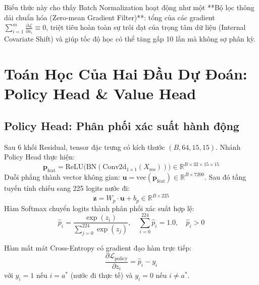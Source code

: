 \documentclass[11pt,a4paper]{report}
\begin{document}
Biểu thức này cho thấy Batch Normalization hoạt động như một **Bộ lọc thông dải chuẩn hóa (Zero-mean Gradient Filter)**: tổng của các gradient $\sum_{i=1}^m \frac{\partial \mathcal{L}}{\partial x_i} \equiv 0$, triệt tiêu hoàn toàn sự trôi dạt của trọng tâm dữ liệu (Internal Covariate Shift) và giúp tốc độ học có thể tăng gấp 10 lần mà không sợ phân kỳ.

\section{Toán Học Của Hai Đầu Dự Đoán: Policy Head \& Value Head}

\subsection{Policy Head: Phân phối xác suất hành động}
Sau 6 khối Residual, tensor đặc trưng có kích thước $(B, 64, 15, 15)$. Nhánh Policy Head thực hiện:
\begin{equation}
    \mathbf{p}_{\text{feat}} = \text{ReLU}\big(\text{BN}(\text{Conv2d}_{1\times 1}(X_{\text{res}}))\big) \in \mathbb{R}^{B \times 32 \times 15 \times 15}
\end{equation}
Duỗi phẳng thành vector không gian: $\mathbf{u} = \text{vec}(\mathbf{p}_{\text{feat}}) \in \mathbb{R}^{B \times 7200}$. Sau đó tầng tuyến tính chiếu sang 225 logits nước đi:
\begin{equation}
    \mathbf{z} = W_p \cdot \mathbf{u} + b_p \in \mathbb{R}^{B \times 225}
\end{equation}
Hàm Softmax chuyển logits thành phân phối xác suất hợp lệ:
\begin{equation}
    \hat{p}_i = \frac{\exp(z_i)}{\sum_{j=0}^{224} \exp(z_j)}, \quad \sum_{i=0}^{224} \hat{p}_i = 1.0, \quad \hat{p}_i > 0
\end{equation}

Hàm mất mát Cross-Entropy có gradient đạo hàm trực tiếp:
\begin{equation}
    \frac{\partial \mathcal{L}_{\text{policy}}}{\partial z_i} = \hat{p}_i - y_i
\end{equation}
với $y_i = 1$ nếu $i = a^*$ (nước đi thực tế) và $y_i = 0$ nếu $i \neq a^*$.
\end{document}
